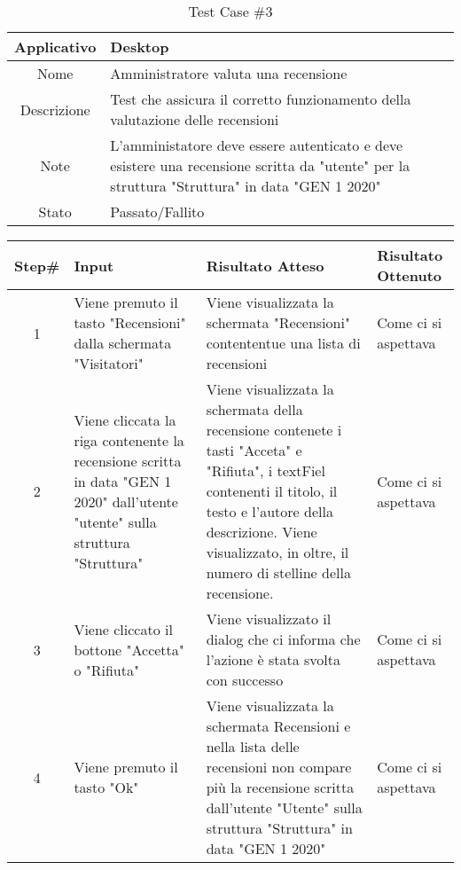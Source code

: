 \pagebreak
\begin{table}[H]
    \centering
    \footnotesize
    \caption{Test Case \#3}
    \begin{tabularx}{\textwidth}{|c|X|}
        \hline
        Applicativo & Desktop\\
        \hline
        Nome & Amministratore valuta una recensione  \\
        \hline
        Descrizione & Test che assicura il corretto funzionamento della valutazione delle recensioni\\
        \hline
        Note & L'amministatore deve essere autenticato e deve esistere una recensione scritta da "utente" per la struttura "Struttura" in data "GEN 1 2020" \\
        \hline
        Stato & Passato/Fallito\\
        \hline

    \end{tabularx}
    \setlength{\tabcolsep}{8pt}
    \renewcommand{\arraystretch}{1.5}
\end{table}

\begin{table}[H]
    \footnotesize
    \begin{tabularx}{\textwidth}{|c|X|X|X|}
        \hline
        Step\# & Input & Risultato Atteso & Risultato Ottenuto \\
        \hline
         1 & Viene premuto il tasto "Recensioni" dalla schermata "Visitatori" 
         & Viene visualizzata la schermata "Recensioni" contententue una lista di recensioni
         &Come ci si aspettava\\
          \hline
        2 & Viene cliccata la riga contenente la recensione scritta in data "GEN 1 2020" dall'utente "utente" sulla struttura "Struttura"
        & Viene visualizzata la schermata della recensione contenete i tasti "Acceta" e  "Rifiuta", i textFiel contenenti il titolo, il testo e l'autore della descrizione.
        Viene visualizzato, in oltre, il numero di stelline della recensione.
        & Come ci si aspettava\\
         \hline 
        3 & Viene cliccato il bottone "Accetta" o "Rifiuta"
         & Viene visualizzato il dialog che ci informa che l'azione è stata svolta con successo
         & Come ci si aspettava\\
          \hline
          4 & Viene premuto il tasto "Ok"
         & Viene visualizzata la schermata Recensioni e nella lista delle recensioni non compare più 
         la recensione scritta dall'utente "Utente" sulla struttura "Struttura" in data "GEN 1 2020"
         & Come ci si aspettava\\
          \hline      
    \end{tabularx}
\end{table}
    
       

